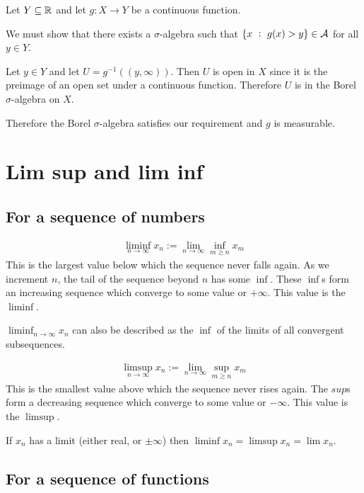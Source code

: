 \begin{lemma*}\label{lemma-continuous-function-is-measurable}
  Let $Y \subseteq \mathbb{R}$ and let $g: X \to Y$ be a continuous function.

  We must show that there exists a $\sigma$-algebra such that $\{x ~:~ g(x) > y\} \in \mathcal A$ for all $y \in Y$.

  Let $y \in Y$ and let $U = g^{-1}((y, \infty))$. Then $U$ is open in $X$ since it is the preimage of an open
  set under a continuous function. Therefore $U$ is in the Borel $\sigma$-algebra on $X$.

  Therefore the Borel $\sigma$-algebra satisfies our requirement and $g$ is measurable.
\end{lemma*}

\section*{Lim sup and lim inf}

\subsection{For a sequence of numbers}
\begin{align*}
  \liminf_{n\to\infty} x_n := \lim_{n\to\infty} \inf_{m \geq n} x_m
\end{align*}
This is the largest value below which the sequence never falls again. As we increment $n$, the tail of the
sequence beyond $n$ has some $\inf$. These $\inf$s form an increasing sequence which converge to some value
or $+\infty$. This value is the $\liminf$.

 $\liminf_{n \to \infty} x_n$ can also be described as the $\inf$ of the limits of all convergent subsequences.

\begin{align*}
  \limsup_{n\to\infty} x_n := \lim_{n\to\infty} \sup_{m \geq n} x_m
\end{align*}
This is the smallest value above which the sequence never rises again. The $sup$s form a decreasing sequence
which converge to some value or $-\infty$. This value is the $\limsup$.

If $x_n$ has a limit (either real, or $\pm\infty$) then $\liminf x_n = \limsup x_n = \lim x_n$.

\subsection*{For  a sequence of functions}

